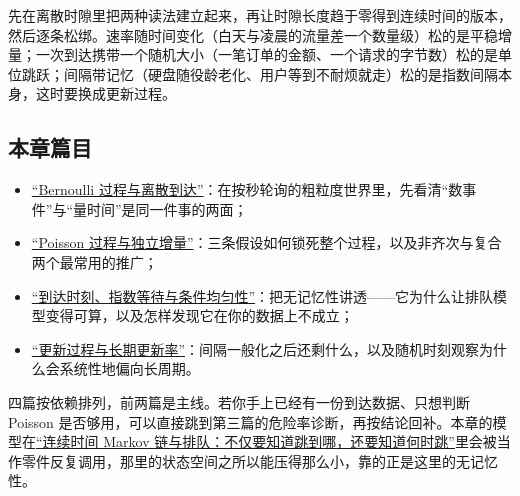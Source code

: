先在离散时隙里把两种读法建立起来，再让时隙长度趋于零得到连续时间的版本，然后逐条松绑。速率随时间变化（白天与凌晨的流量差一个数量级）松的是平稳增量；一次到达携带一个随机大小（一笔订单的金额、一个请求的字节数）松的是单位跳跃；间隔带记忆（硬盘随役龄老化、用户等到不耐烦就走）松的是指数间隔本身，这时要换成更新过程。

\subsection{本章篇目}

\begin{itemize}
\tightlist
\item \hyperref[sec:06-Random-Processes/02-Counting-Processes/01]{``Bernoulli 过程与离散到达''}：在按秒轮询的粗粒度世界里，先看清``数事件''与``量时间''是同一件事的两面；
\item \hyperref[sec:06-Random-Processes/02-Counting-Processes/02]{``Poisson 过程与独立增量''}：三条假设如何锁死整个过程，以及非齐次与复合两个最常用的推广；
\item \hyperref[sec:06-Random-Processes/02-Counting-Processes/03]{``到达时刻、指数等待与条件均匀性''}：把无记忆性讲透——它为什么让排队模型变得可算，以及怎样发现它在你的数据上不成立；
\item \hyperref[sec:06-Random-Processes/02-Counting-Processes/04]{``更新过程与长期更新率''}：间隔一般化之后还剩什么，以及随机时刻观察为什么会系统性地偏向长周期。
\end{itemize}

四篇按依赖排列，前两篇是主线。若你手上已经有一份到达数据、只想判断 Poisson 是否够用，可以直接跳到第三篇的危险率诊断，再按结论回补。本章的模型在\hyperref[ch:050]{``连续时间 Markov 链与排队：不仅要知道跳到哪，还要知道何时跳''}里会被当作零件反复调用，那里的状态空间之所以能压得那么小，靠的正是这里的无记忆性。
